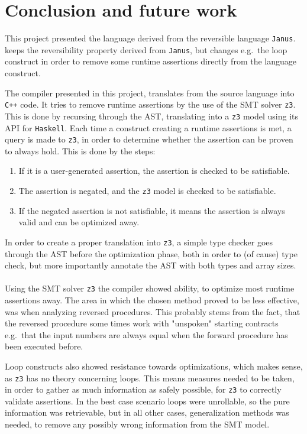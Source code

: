 \section{Conclusion and future work }
This project presented the language \lan derived from the reversible language \texttt{Janus}.
\lan keeps the reversibility property derived from \texttt{Janus}, but changes e.g.\ the loop
construct in order to remove some runtime assertions directly from the language construct.

The \lan compiler presented in this project, translates from the source language into \texttt{C++}
code. It tries to remove runtime assertions by the use of the SMT solver \texttt{z3}. This is
done by recursing through the AST, translating into a \texttt{z3} model using its API for
\texttt{Haskell}. Each time a construct creating a runtime assertions is met, a query is made to
\texttt{z3}, in order to determine whether the assertion can be proven to always hold. This is
done by the steps:
\begin{enumerate}
      \item If it is a user-generated assertion, the assertion is checked to be satisfiable.
      \item The assertion is negated, and the \texttt{z3} model is checked to be satisfiable.
      \item If the negated assertion is not satisfiable, it means the assertion is always valid
            and can be optimized away.
\end{enumerate}
\noindent
In order to create a proper translation into \texttt{z3}, a simple type checker goes through the
AST before the optimization phase, both in order to (of cause) type check, but more importantly
annotate the AST with both types and array sizes.
\\
\\
Using the SMT solver \texttt{z3} the \lan compiler showed ability, to optimize most runtime
assertions away. The area in which the chosen method proved to be less effective, was when
analyzing reversed procedures. This probably stems from the fact, that the reversed procedure
some times work with "unspoken" starting contracts e.g.\ that the input numbers are always equal
when the forward procedure has been executed before.

Loop constructs also showed resistance towards optimizations, which makes sense, as \texttt{z3}
has no theory concerning loops. This means measures needed to be taken, in order to gather as much
information as safely possible, for \texttt{z3} to correctly validate assertions. In the best case
scenario loops were unrollable, so the pure information was retrievable, but in all other
cases, generalization methods was needed, to remove any possibly wrong information from the
SMT model.

